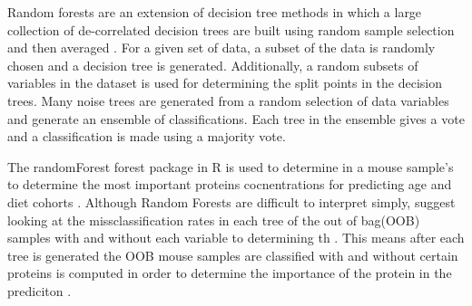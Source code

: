 \documentclass[a4paper,11pt,twoside]{book}
\begin{document}
  	Random forests are an extension of decision tree methods in which a large collection of de-correlated decision trees are built using random sample selection and then averaged \citep{Hastie2009}. For a given set of data, a subset of the data is randomly chosen and a decision tree is generated. Additionally, a random subsets of variables in the dataset is used for determining the split points in the decision trees. Many noise trees are generated from a random selection of data variables and generate an ensemble of classifications. Each tree in the ensemble gives a vote and a classification is made using a majority vote\citep{Hastie2009}.  
  	
  	The randomForest forest package in R is used to determine in a mouse sample's to determine the most important proteins cocnentrations for predicting age and diet cohorts \citep{Liaw2015}. Although Random Forests are difficult to interpret simply,\citeauthor{Breiman2001} suggest looking at the missclassification rates in each tree of the out of bag(OOB) samples with and without each variable to determining th \citep{Breiman2001}. This means after each tree is generated the OOB mouse samples are classified with and without certain proteins is computed in order to determine the importance of the protein in the prediciton \citep{Hastie2009}. 
	
\end{document}
